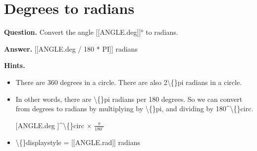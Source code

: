 \documentclass{article}
\begin{document}
\section*{Degrees to radians}
\textbf{Question.} Convert the angle [[ANGLE.deg]]° to radians.

\textbf{Answer.} [[ANGLE.deg / 180 * PI]]
                     radians

\textbf{Hints.}
\begin{itemize}
  \item There are 360 degrees in a circle. There
                        are also 2\textbackslash\{\}pi radians in a circle.
  \item In other words, there are \textbackslash\{\}pi radians per
                        180 degrees. So we can convert from
                        degrees to radians by multiplying by \textbackslash\{\}pi,
                        and dividing by 180\textasciicircum{}\textbackslash\{\}circ.
  \item [[ANGLE.deg]]\textasciicircum{}\textbackslash\{\}circ
                        $\times$ $\frac{\pi}{180^\circ}$
  \item \textbackslash\{\}displaystyle = [[ANGLE.rad]]
                        radians
\end{itemize}
\end{document}
